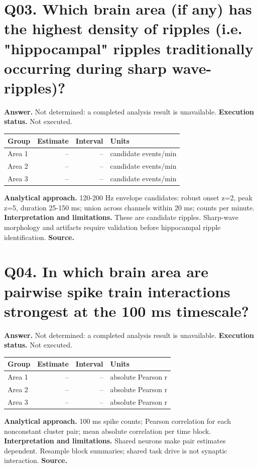 \documentclass[11pt,a4paper]{article}
\begin{document}
\section*{Q03. Which brain area (if any) has the highest density of ripples (i.e. "hippocampal" ripples traditionally occurring during sharp wave-ripples)?}
\textbf{Answer.} Not determined: a completed analysis result is unavailable.
\textbf{Execution status.} Not executed.
\begin{tabularx}{\linewidth}{XrrX}\toprule Group & Estimate & Interval & Units \\\midrule
Area 1 & -- & -- & candidate events/min \\
Area 2 & -- & -- & candidate events/min \\
Area 3 & -- & -- & candidate events/min \\
\bottomrule\end{tabularx}
\textbf{Analytical approach.} 120-200 Hz envelope candidates: robust onset z=2, peak z=5, duration 25-150 ms; union across channels within 20 ms; counts per minute.
\textbf{Interpretation and limitations.} These are candidate ripples. Sharp-wave morphology and artifacts require validation before hippocampal ripple identification.
\textbf{Source.} 
\clearpage
\section*{Q04. In which brain area are pairwise spike train interactions strongest at the 100 ms timescale?}
\textbf{Answer.} Not determined: a completed analysis result is unavailable.
\textbf{Execution status.} Not executed.
\begin{tabularx}{\linewidth}{XrrX}\toprule Group & Estimate & Interval & Units \\\midrule
Area 1 & -- & -- & absolute Pearson r \\
Area 2 & -- & -- & absolute Pearson r \\
Area 3 & -- & -- & absolute Pearson r \\
\bottomrule\end{tabularx}
\textbf{Analytical approach.} 100 ms spike counts; Pearson correlation for each nonconstant cluster pair; mean absolute correlation per time block.
\textbf{Interpretation and limitations.} Shared neurons make pair estimates dependent. Resample block summaries; shared task drive is not synaptic interaction.
\textbf{Source.} 
\clearpage
\end{document}
